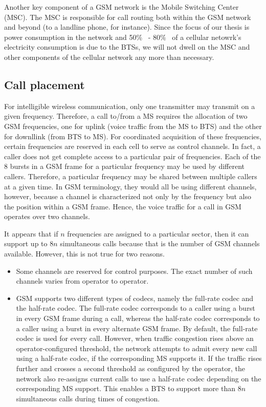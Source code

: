 Another key component of a GSM network is the Mobile Switching Center (MSC). The MSC is responsible for call routing both within the GSM network and beyond (to a landline phone, for instance). Since the focus of our thesis is power consumption in the network and 50\%~\cite{Louhi:2007:BTSPower:INTELEC} - 80\%~\cite{Oh:Comm:2011} of a cellular netowrk's electricity consumption is due to the BTSs, we will not dwell on the MSC and other components of the cellular network any more than necessary.

\subsection{Call placement} %
For intelligible wireless communication, only one transmitter may transmit on a given frequency. Therefore, a call to/from a MS requires the allocation of two GSM frequencies, one for uplink (voice traffic from the MS to BTS) and the other for downllink (from BTS to MS). For coordinated acquisition of these frequencies, certain frequencies are reserved in each cell to serve as control channels. In fact, a caller does not get complete access to a particular pair of frequencies. Each of the 8 bursts in a GSM frame for a particular frequency may be used by different callers. Therefore, a particular frequency may be shared between multiple callers at a given time. In GSM terminology, they would all be using different channels, however, because a channel is characterized not only by the frequency but also the position within a GSM frame. Hence, the voice traffic for a call in GSM operates over two channels.

It appears that if $n$ frequencies are assigned to a particular sector, then it can support up to $8n$ simultaneous calls because that is the number of GSM channels available. However, this is not true for two reasons. 
\begin{itemize}
\item Some channels are reserved for control purposes. The exact number of such channels varies from operator to operator.
\item GSM supports two different types of codecs, namely the full-rate codec and the half-rate codec. The full-rate codec corresponds to a caller using a burst in every GSM frame during a call, whereas the half-rate codec corresponds to a caller using a burst in every alternate GSM frame. By default, the full-rate codec is used for every call. However, when traffic congestion rises above an operator-configured threshold, the network attempts to admit every new call using a half-rate codec, if the corresponding MS supports it. If the traffic rises further and crosses a second threshold as configured by the operator, the network also re-assigns current calls to use a half-rate codec depending on the corresponding MS support. This enables a BTS to support more than $8n$ simultaneous calls during times of congestion.
\end{itemize}
 


